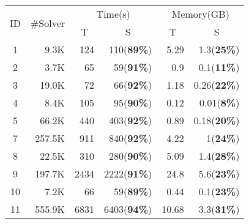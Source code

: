 \begin{table}[]
{\begin{tabular}{cr|rr|rr}
\hline
\multicolumn{1}{l}{\multirow{2}{*}{ID}} & \multicolumn{1}{l|}{\multirow{2}{*}{\#Solver}} & \multicolumn{2}{c|}{Time(s)}                   & \multicolumn{2}{c}{Memory(GB)}                \\
\multicolumn{1}{l}{}                    & \multicolumn{1}{l|}{}                          & \multicolumn{1}{c}{T} & \multicolumn{1}{c|}{S} & \multicolumn{1}{c}{T} & \multicolumn{1}{c}{S} \\ \hline
\multicolumn{1}{c|}{1}                  & 9.3K                                           & 124                   & 110(\textbf{89\%})     & 5.29                  & 1.3(\textbf{25\%})    \\
\multicolumn{1}{c|}{2}                  & 3.7K                                           & 65                    & 59(\textbf{91\%})      & 0.9                   & 0.1(\textbf{11\%})    \\
\multicolumn{1}{c|}{3}                  & 19.0K                                          & 72                    & 66(\textbf{92\%})      & 1.18                  & 0.26(\textbf{22\%})   \\
\multicolumn{1}{c|}{4}                  & 8.4K                                           & 105                   & 95(\textbf{90\%})      & 0.12                  & 0.01(\textbf{8\%})    \\
\multicolumn{1}{c|}{5}                  & 66.2K                                          & 440                   & 403(\textbf{92\%})     & 0.89                  & 0.18(\textbf{20\%})   \\
\multicolumn{1}{c|}{7}                  & 257.5K                                         & 911                   & 840(\textbf{92\%})     & 4.22                  & 1(\textbf{24\%})      \\
\multicolumn{1}{c|}{8}                  & 22.5K                                          & 310                   & 280(\textbf{90\%})     & 5.09                  & 1.4(\textbf{28\%})    \\
\multicolumn{1}{c|}{9}                  & 197.7K                                         & 2434                  & 2222(\textbf{91\%})    & 24.8                  & 5.6(\textbf{23\%})    \\
\multicolumn{1}{c|}{10}                 & 7.2K                                           & 66                    & 59(\textbf{89\%})      & 0.44                  & 0.1(\textbf{23\%})    \\
\multicolumn{1}{c|}{11}                 & 555.9K                                         & 6831                  & 6403(\textbf{94\%})    & 10.68                 & 3.3(\textbf{31\%})    \\

\end{tabular}}
\end{table}
